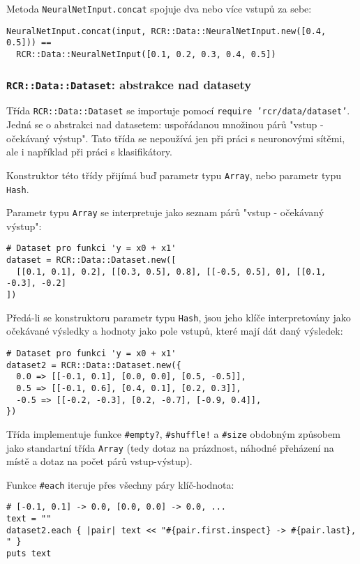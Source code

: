 \documentclass[a4paper]{article}
\begin{document}
Metoda \texttt{NeuralNetInput.concat} spojuje dva nebo více vstupů za sebe:
\begin{lstlisting}
NeuralNetInput.concat(input, RCR::Data::NeuralNetInput.new([0.4, 0.5])) ==
  RCR::Data::NeuralNetInput([0.1, 0.2, 0.3, 0.4, 0.5])
\end{lstlisting}


\subsubsection{\texttt{RCR::Data::Dataset}: abstrakce nad datasety}
Třída \texttt{RCR::Data::Dataset} se importuje pomocí \texttt{require
'rcr/data/dataset'}. Jedná se o abstrakci nad datasetem: uspořádanou
množinou párů "vstup - očekávaný výstup". Tato třída se nepoužívá jen
při práci s neuronovými sítěmi, ale i například při práci s klasifikátory.

Konstruktor této třídy přijímá buď parametr typu \texttt{Array}, nebo parametr
typu \texttt{Hash}.

Parametr typu \texttt{Array} se interpretuje jako seznam
párů "vstup - očekávaný výstup":
\begin{lstlisting}
# Dataset pro funkci 'y = x0 + x1'
dataset = RCR::Data::Dataset.new([
  [[0.1, 0.1], 0.2], [[0.3, 0.5], 0.8], [[-0.5, 0.5], 0], [[0.1, -0.3], -0.2]
])
\end{lstlisting}

Předá-li se konstruktoru parametr typu \texttt{Hash}, jsou jeho
klíče interpretovány jako očekávané výsledky a hodnoty jako
pole vstupů, které mají dát daný výsledek:
\begin{lstlisting}
# Dataset pro funkci 'y = x0 + x1'
dataset2 = RCR::Data::Dataset.new({
  0.0 => [[-0.1, 0.1], [0.0, 0.0], [0.5, -0.5]],
  0.5 => [[-0.1, 0.6], [0.4, 0.1], [0.2, 0.3]],
  -0.5 => [[-0.2, -0.3], [0.2, -0.7], [-0.9, 0.4]],
})
\end{lstlisting}

Třída implementuje funkce \texttt{\#empty?}, \texttt{\#shuffle!} a
\texttt{\#size} obdobným způsobem jako standartní třída \texttt{Array}
(tedy dotaz na prázdnost, náhodné přeházení na místě a dotaz na počet párů
vstup-výstup).

Funkce \texttt{\#each} iteruje přes všechny páry klíč-hodnota:
\begin{lstlisting}
# [-0.1, 0.1] -> 0.0, [0.0, 0.0] -> 0.0, ...
text = ""
dataset2.each { |pair| text << "#{pair.first.inspect} -> #{pair.last}, " }
puts text
\end{lstlisting}
\end{document}
